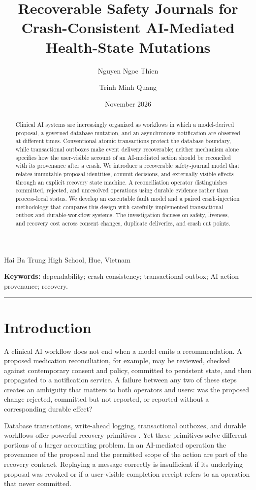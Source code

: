 \documentclass[11pt,a4paper]{article}
\title{\vspace{-1em}\textbf{Recoverable Safety Journals for Crash-Consistent AI-Mediated Health-State Mutations}}
\author{Nguyen Ngoc Thien \and Trinh Minh Quang}\date{November 2026}
\begin{document}
\maketitle
\begin{center}\small Hai Ba Trung High School, Hue, Vietnam\end{center}
\begin{abstract}
Clinical AI systems are increasingly organized as workflows in which a model-derived proposal, a governed database mutation, and an asynchronous notification are observed at different times. Conventional atomic transactions protect the database boundary, while transactional outboxes make event delivery recoverable; neither mechanism alone specifies how the user-visible account of an AI-mediated action should be reconciled with its provenance after a crash. We introduce a recoverable safety-journal model that relates immutable proposal identities, commit decisions, and externally visible effects through an explicit recovery state machine. A reconciliation operator distinguishes committed, rejected, and unresolved operations using durable evidence rather than process-local status. We develop an executable fault model and a paired crash-injection methodology that compares this design with carefully implemented transactional-outbox and durable-workflow systems. The investigation focuses on safety, liveness, and recovery cost across consent changes, duplicate deliveries, and crash cut points.
\end{abstract}
\noindent\textbf{Keywords:} dependability; crash consistency; transactional outbox; AI action provenance; recovery.
\medskip\hrule\medskip

\section{Introduction}
A clinical AI workflow does not end when a model emits a recommendation. A proposed medication reconciliation, for example, may be reviewed, checked against contemporary consent and policy, committed to persistent state, and then propagated to a notification service. A failure between any two of these steps creates an ambiguity that matters to both operators and users: was the proposed change rejected, committed but not reported, or reported without a corresponding durable effect?

Database transactions, write-ahead logging, transactional outboxes, and durable workflows offer powerful recovery primitives \cite{kung1981,herlihy1990}. Yet these primitives solve different portions of a larger accounting problem. In an AI-mediated operation the provenance of the proposal and the permitted scope of the action are part of the recovery contract. Replaying a message correctly is insufficient if its underlying proposal was revoked or if a user-visible completion receipt refers to an operation that never committed.
\end{document}
